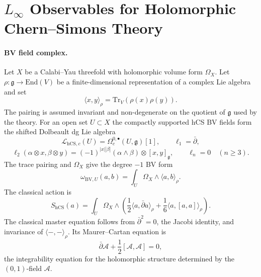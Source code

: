 \providecommand{\Obs}{\mathrm{Obs}}
\providecommand{\hCS}{\mathrm{hCS}}
\providecommand{\CE}{\mathrm{CE}}
\providecommand{\BV}{\mathrm{BV}}
\providecommand{\MC}{\mathrm{MC}}
\providecommand{\QME}{\mathrm{QME}}
\providecommand{\dbar}{\bar\partial}
\providecommand{\cA}{\mathcal A}
\providecommand{\cF}{\mathcal F}
\providecommand{\cH}{\mathcal H}
\providecommand{\cL}{\mathcal L}
\providecommand{\cO}{\mathcal O}
\providecommand{\cW}{\mathcal W}
\providecommand{\fg}{\mathfrak g}
\providecommand{\C}{\mathbb C}
\providecommand{\End}{\mathrm{End}}
\providecommand{\FM}{\mathrm{FM}}
\providecommand{\Ran}{\mathrm{Ran}}
\providecommand{\Rep}{\mathrm{Rep}}
\providecommand{\Sym}{\mathrm{Sym}}
\providecommand{\Tr}{\mathrm{Tr}}
\providecommand{\Yplus}{Y^+}
\providecommand{\Eone}{E_1}
\providecommand{\Etwo}{E_2}
\providecommand{\kch}{\kappa_{\mathrm{ch}}}
\providecommand{\kcat}{\kappa_{\mathrm{cat}}}
\providecommand{\kBKM}{\kappa_{\mathrm{BKM}}}
\providecommand{\kfiber}{\kappa_{\mathrm{fiber}}}
\providecommand{\kHeis}{\kappa_{\mathrm{ch}}^{\mathrm{Heis}}}
\providecommand{\kanom}{\kappa_{\mathrm{anom}}}

\section*{$L_\infty$ Observables for Holomorphic Chern--Simons Theory}

\paragraph{BV field complex.}
Let \(X\) be a Calabi--Yau threefold with holomorphic volume form
\(\Omega_X\).  Let \(\rho:\fg\to\End(V)\) be a finite-dimensional
representation of a complex Lie algebra and set
\[
  \langle x,y\rangle_\rho=\Tr_V(\rho(x)\rho(y)).
\]
The pairing is assumed invariant and non-degenerate on the quotient of
\(\fg\) used by the theory.  For an open set \(U\subset X\) the compactly
supported hCS BV fields form the shifted Dolbeault dg Lie algebra
\[
  \cL_{\hCS,c}(U)
  =
  \Omega^{0,\bullet}_c(U,\fg)[1],
  \qquad
  \ell_1=\dbar,
\]
\[
  \ell_2(\alpha\otimes x,\beta\otimes y)
  =
  (-1)^{|x||\beta|}
  (\alpha\wedge\beta)\otimes[x,y]_\fg,
  \qquad
  \ell_n=0\quad(n\geq3).
\]
The trace pairing and \(\Omega_X\) give the degree \(-1\) BV form
\[
  \omega_{\BV,U}(a,b)
  =
  \int_U\Omega_X\wedge\langle a,b\rangle_\rho .
\]
The classical action is
\[
  S_{\hCS}(a)
  =
  \int_U\Omega_X\wedge
  \left(
    \frac12\langle a,\dbar a\rangle_\rho
    +\frac16\langle a,[a,a]\rangle_\rho
  \right).
\]
The classical master equation follows from \(\dbar^2=0\), the Jacobi
identity, and invariance of \(\langle-,-\rangle_\rho\).  Its
Maurer--Cartan equation is
\[
  \dbar\cA+\frac12[\cA,\cA]=0,
\]
the integrability equation for the holomorphic structure determined by
the \((0,1)\)-field \(\cA\).

